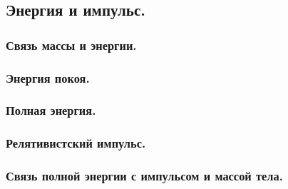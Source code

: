 \documentclass{article}
\begin{document}
    \subsection{Энергия и импульс.}
        \subsubsection{Связь массы и энергии.}
        \subsubsection{Энергия покоя.}
        \subsubsection{Полная энергия.}
        \subsubsection{Релятивистский импульс.}
        \subsubsection{Связь полной энергии с импульсом и массой тела.}

    
\end{document}

